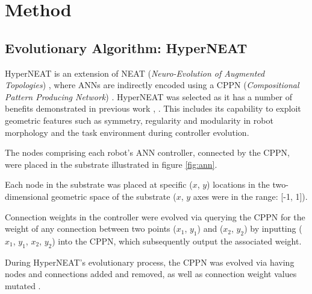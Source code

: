
\chapter{Method} %

\label{Chapter3} %


\section{Evolutionary Algorithm: HyperNEAT} \label{sec:method_hyperneat}

HyperNEAT \cite{StanleyDAmbrosioGauci2009} is an extension of NEAT (\textit{Neuro-Evolution of Augmented Topologies})
\cite{StanleyMiikkulainen2002}, where ANNs are indirectly encoded using a CPPN (\textit{Compositional Pattern Producing Network})
\cite{Stanley2007}.
HyperNEAT was selected as it has a number of benefits demonstrated in previous work \cite{DAmbrosio2013},
\cite{WatsonNitschke2015SSCI}.
This includes its capability to exploit geometric features such as symmetry, regularity and modularity
in robot morphology and the task environment during controller evolution.

The nodes comprising each robot's ANN controller, connected by the CPPN, were placed in the substrate
illustrated in figure \ref{fig:ann}.

Each node in the substrate was placed at specific ($x$, $y$) locations in the two-dimensional geometric space
of the substrate ($x$, $y$ axes were in the range: [-1, 1]).

Connection weights in the controller were evolved via querying the CPPN for the weight of any connection
between two points ($x_{1}$, $y_{1}$) and ($x_{2}$, $y_{2}$) by inputting ($x_{1}$, $y_{1}$, $x_{2}$, $y_{2}$)
into the CPPN, which subsequently output the associated weight.

During HyperNEAT's evolutionary process, the CPPN was evolved via having nodes and connections added and removed, as well
as connection weight values mutated \cite{StanleyDAmbrosioGauci2009}.


